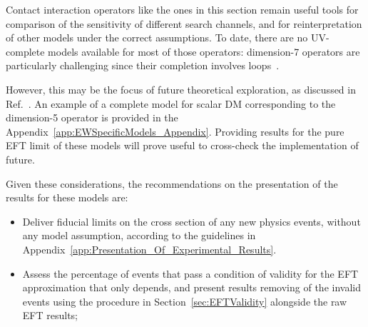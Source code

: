Contact interaction operators like the ones in this section 
remain useful tools for comparison of the sensitivity of different search channels, 
and for reinterpretation of other models under the correct assumptions. 
To date, there are no UV-complete models available for most of those operators:
dimension-7 operators are particularly challenging since their completion involves loops~. 

However, this may be the focus of future theoretical exploration, as discussed in Ref.~\cite{Crivellin:2015wva}.
An example of a complete model 
for scalar DM corresponding to the dimension-5 operator 
is provided in the Appendix~\ref{app:EWSpecificModels_Appendix}.
Providing results for the pure EFT limit of these models will prove useful
to cross-check the implementation of future. 

Given these considerations, the recommendations on the presentation of the results
for these models are: 

\begin{itemize}
\item Deliver fiducial limits on the cross section of any new physics events, without any model assumption, according to the guidelines in Appendix~\ref{app:Presentation_Of_Experimental_Results}.  
\item Assess the percentage of events that pass a condition of validity for the EFT approximation that only depends, and present results removing 
of the invalid events using the procedure in Section~\ref{sec:EFTValidity} alongside the raw EFT results;
\end{itemize}



